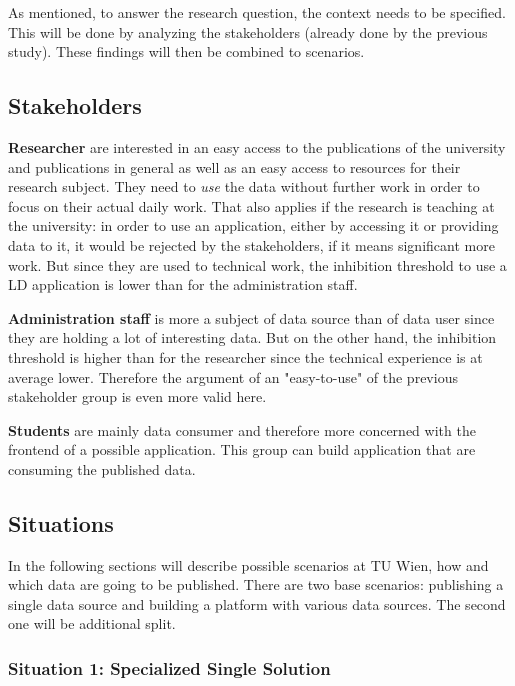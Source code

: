 As mentioned, to answer the research question, the context needs to be specified. This will be done by analyzing the stakeholders (already done by the previous study). These findings will then be combined to scenarios.

\subsection{Stakeholders}

\textbf{Researcher} are interested in an easy access to the publications of the university and publications in general as well as an easy access to resources for their research subject. They need to \emph{use} the data without further work in order to focus on their actual daily work. That also applies if the research is teaching at the university: in order to use an application, either by accessing it or providing data to it, it would be rejected by the stakeholders, if it means significant more work. But since they are used to technical work, the inhibition threshold to use a LD application is lower than for the administration staff.

\textbf{Administration staff} is more a subject of data source than of data user since they are holding a lot of interesting data. But on the other hand, the 
inhibition threshold is higher than for the researcher since the technical experience is at average lower. Therefore the argument of an "easy-to-use" of the previous stakeholder group is even more valid here.

\textbf{Students} are mainly data consumer and therefore more concerned with the frontend of a possible application. This group can build application that are consuming the published data.

\subsection{Situations}

In the following sections will describe possible scenarios at TU Wien, how and which data are going to be published. There are two base scenarios: publishing a single data source and building a platform with various data sources. The second one will be additional split.

\subsubsection{Situation 1: Specialized Single Solution}

